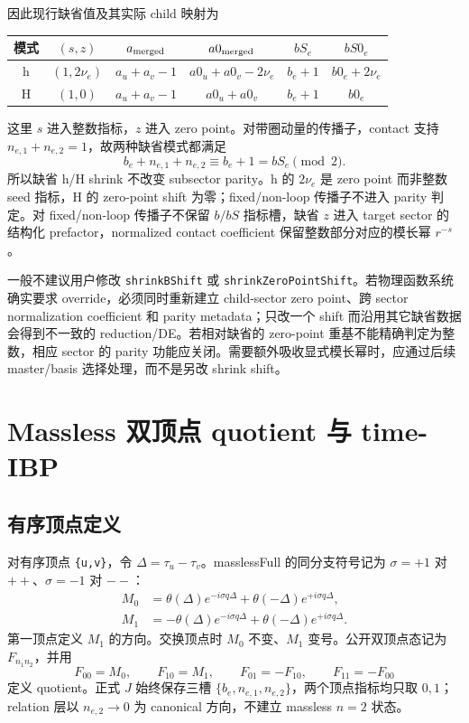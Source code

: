 ﻿\documentclass[a4paper,11pt]{article}
\begin{document}
因此现行缺省值及其实际 child 映射为
\begin{center}
\begin{tabular}{c|c|c|c|c|c}
\toprule
模式 & $(s,z)$ & $a_{\rm merged}$ & $a0_{\rm merged}$ & $bS_e$ & $bS0_e$\\
\midrule
h & $(1,2\nu_e)$ & $a_u+a_v-1$ & $a0_u+a0_v-2\nu_e$ & $b_e+1$ & $b0_e+2\nu_e$\\
H & $(1,0)$ & $a_u+a_v-1$ & $a0_u+a0_v$ & $b_e+1$ & $b0_e$\\
\bottomrule
\end{tabular}
\end{center}
这里 $s$ 进入整数指标，$z$ 进入 zero point。对带圈动量的传播子，contact 支持 $n_{e,1}+n_{e,2}=1$，故两种缺省模式都满足
\begin{equation}
 b_e+n_{e,1}+n_{e,2}\equiv b_e+1=bS_e\pmod 2.
\end{equation}
所以缺省 h/H shrink 不改变 subsector parity。h 的 $2\nu_e$ 是 zero point 而非整数 seed 指标，H 的 zero-point shift 为零；fixed/non-loop 传播子不进入 parity 判定。对 fixed/non-loop 传播子不保留 $b/bS$ 指标槽，缺省 $z$ 进入 target sector 的结构化 prefactor，normalized contact coefficient 保留整数部分对应的模长幂 $r^{-s}$。

一般不建议用户修改 \texttt{shrinkBShift} 或 \texttt{shrinkZeroPointShift}。若物理函数系统确实要求 override，必须同时重新建立 child-sector zero point、跨 sector normalization coefficient 和 parity metadata；只改一个 shift 而沿用其它缺省数据会得到不一致的 reduction/DE。若相对缺省的 zero-point 重基不能精确判定为整数，相应 sector 的 parity 功能应关闭。需要额外吸收显式模长幂时，应通过后续 master/basis 选择处理，而不是另改 shrink shift。

\section{Massless 双顶点 quotient 与 time-IBP}

\subsection{有序顶点定义}

对有序顶点 \texttt{\{u,v\}}，令 $\Delta=\tau_u-\tau_v$。masslessFull 的同分支符号记为 $\sigma=+1$ 对 $++$、$\sigma=-1$ 对 $--$：
\begin{align}
 M_0&=\theta(\Delta)e^{-i\sigma q\Delta}
      +\theta(-\Delta)e^{+i\sigma q\Delta},\\
 M_1&=-\theta(\Delta)e^{-i\sigma q\Delta}
      +\theta(-\Delta)e^{+i\sigma q\Delta}.
 \label{masslessM01}
\end{align}
第一顶点定义 $M_1$ 的方向。交换顶点时 $M_0$ 不变、$M_1$ 变号。公开双顶点态记为 $F_{n_1n_2}$，并用
\begin{equation}
 F_{00}=M_0,\qquad F_{10}=M_1,\qquad
 F_{01}=-F_{10},\qquad F_{11}=-F_{00}
 \label{masslessDoubleEndpoint}
\end{equation}
定义 quotient。正式 $J$ 始终保存三槽 $\{b_e,n_{e,1},n_{e,2}\}$，两个顶点指标均只取 $0,1$；relation 层以 $n_{e,2}\to0$ 为 canonical 方向，不建立 massless $n=2$ 状态。
\end{document}
